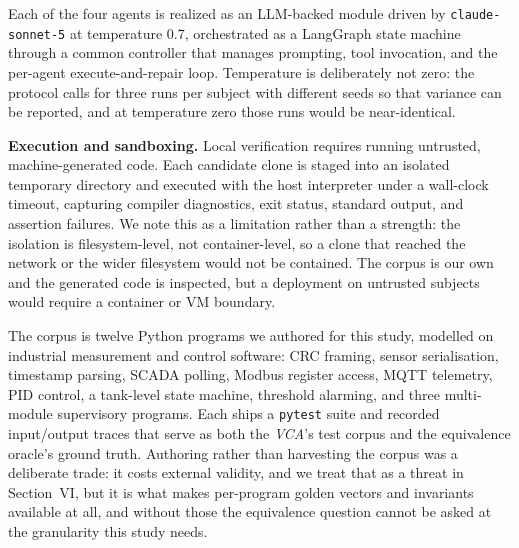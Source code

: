 


Each of the four agents is realized as an LLM-backed module driven by
\texttt{claude-sonnet-5} at temperature 0.7, orchestrated as a LangGraph state
machine through a common controller that manages prompting, tool invocation,
and the per-agent execute-and-repair loop. Temperature is deliberately not
zero: the protocol calls for three runs per subject with different seeds so
that variance can be reported, and at temperature zero those runs would be
near-identical.

\textbf{Execution and sandboxing.} Local verification requires running
untrusted, machine-generated code. Each candidate clone is staged into an
isolated temporary directory and executed with the host interpreter under a
wall-clock timeout, capturing compiler diagnostics, exit status, standard
output, and assertion failures. We note this as a limitation rather than a
strength: the isolation is filesystem-level, not container-level, so a clone
that reached the network or the wider filesystem would not be contained. The
corpus is our own and the generated code is inspected, but a deployment on
untrusted subjects would require a container or VM boundary.


The corpus is twelve Python programs we authored for this study, modelled on
industrial measurement and control software: CRC framing, sensor
serialisation, timestamp parsing, SCADA polling, Modbus register access, MQTT
telemetry, PID control, a tank-level state machine, threshold alarming, and
three multi-module supervisory programs. Each ships a \texttt{pytest} suite and
recorded input/output traces that serve as both the \emph{VCA}'s test corpus
and the equivalence oracle's ground truth. Authoring rather than harvesting the
corpus was a deliberate trade: it costs external validity, and we treat that as
a threat in Section~VI, but it is what makes per-program golden vectors and
invariants available at all, and without those the equivalence question cannot
be asked at the granularity this study needs.

